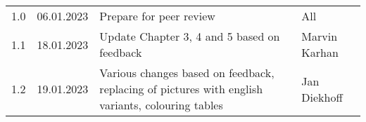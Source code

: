 \begin{footnotesize}
\begin{longtable}[L L L L]{ p{} p{} p{} p{} }
    \rowcolor{Gray}
    1.0              & 06.01.2023    & Prepare for peer review                                                                                                                       & All             \\
    
    1.1              & 18.01.2023    & Update Chapter 3, 4 and 5 based on feedback                                                                                                   & Marvin Karhan   \\

    \rowcolor{Gray}
    1.2              & 19.01.2023    & Various changes based on feedback, replacing of pictures with english variants, colouring tables                                              & Jan Diekhoff    \\
    \bottomrule
  \end{longtable}
\end{footnotesize}
\rmfamily